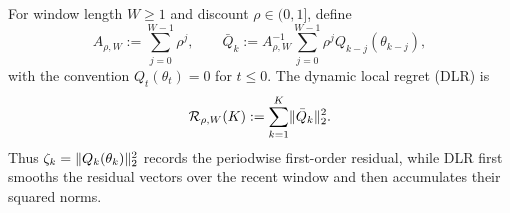 For window length $W\ge1$ and discount $\rho\in(0,1]$, define
\begin{equation}\label{eq:dynamic-window-residual}
 A_{\rho,W}:=\sum_{j=0}^{W-1}\rho^j,
 \qquad
 \bar Q_k
 :=A_{\rho,W}^{-1}\sum_{j=0}^{W-1}\rho^j Q_{k-j}(\theta_{k-j}),
\end{equation}
with the convention $Q_t(\theta_t)=0$ for $t\le0$.  The dynamic local regret (DLR) is
\begin{equation}\label{eq:dynamic-regret}
 \mathcal R_{\rho,W}(K):=\sum_{k=1}^{K}\lVert\bar Q_k\rVert_2^2.
\end{equation}
Thus $\zeta_k=\lVert Q_k(\theta_k)\rVert_2^2$ records the periodwise first-order residual, while DLR first smooths the residual vectors over the recent window and then accumulates their squared norms.
